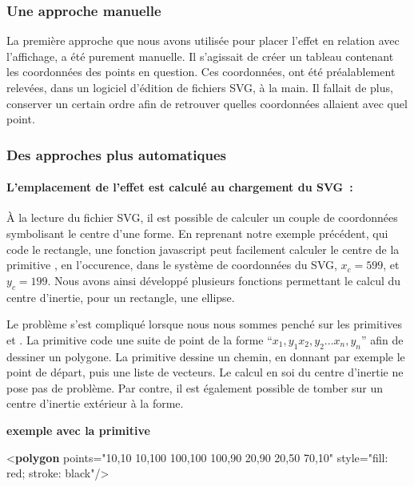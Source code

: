 \documentclass[
]{book}
\newenvironment{Shaded}{\begin{snugshade}}{\end{snugshade}}
\newcommand{\KeywordTok}[1]{\textcolor[rgb]{0.13,0.29,0.53}{\textbf{#1}}}
\newcommand{\NormalTok}[1]{#1}
\newcommand{\OtherTok}[1]{\textcolor[rgb]{0.56,0.35,0.01}{#1}}
\newcommand{\StringTok}[1]{\textcolor[rgb]{0.31,0.60,0.02}{#1}}
\begin{document}
\hypertarget{une-approche-manuelle}{%
\subsubsection{Une approche manuelle}\label{une-approche-manuelle}}

La première approche que nous avons utilisée pour placer l'effet en
relation avec l'affichage, a été purement manuelle. Il s'agissait de créer un
tableau contenant les coordonnées des points en question. Ces coordonnées,
ont été préalablement relevées, dans un logiciel d'édition de fichiers SVG, à
la main. Il fallait de plus, conserver un certain ordre afin de retrouver
quelles coordonnées allaient avec quel point.

\hypertarget{des-approches-plus-automatiques}{%
\subsubsection{Des approches plus automatiques}\label{des-approches-plus-automatiques}}

\hypertarget{lemplacement-de-leffet-est-calculuxe9-au-chargement-du-svg}{%
\paragraph{L'emplacement de l'effet est calculé au chargement du SVG~:}\label{lemplacement-de-leffet-est-calculuxe9-au-chargement-du-svg}}

À la lecture du fichier SVG, il est possible de calculer un couple de
coordonnées symbolisant le centre d'une forme. En reprenant notre exemple
précédent, qui code le rectangle, une fonction javascript peut facilement
calculer le centre de la primitive , en l'occurence, dans le
système de coordonnées du SVG, \(x_c=599\), et \(y_c=199\). Nous avons
ainsi développé plusieurs fonctions permettant le calcul du centre d'inertie,
pour un rectangle, une ellipse.

Le problème s'est compliqué lorsque nous nous sommes penché sur les
primitives et . La primitive code
une suite de point de la forme ``\(x_1,y_1   x_2,y_2... x_n,y_n\)'' afin de dessiner
un polygone. La primitive dessine un chemin, en donnant par
exemple le point de départ, puis une liste de vecteurs. Le calcul en soi du
centre d'inertie ne pose pas de problème. Par contre, il est également
possible de tomber sur un centre d'inertie extérieur à la forme.

\textbf{exemple avec la primitive }

\begin{Shaded}
\begin{Highlighting}[]
\NormalTok{\textless{}}\KeywordTok{polygon}\OtherTok{ points=}\StringTok{"10,10 10,100 100,100 100,90 20,90 20,50 70,10"}
\OtherTok{         style=}\StringTok{"fill: red; stroke: black"}\NormalTok{/\textgreater{}}
\end{Highlighting}
\end{Shaded}
\end{document}

